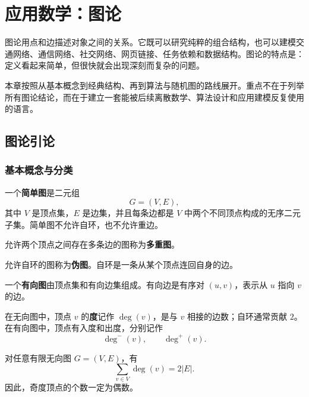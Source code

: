 \chapter{应用数学：图论}

图论用点和边描述对象之间的关系。它既可以研究纯粹的组合结构，也可以建模交通网络、通信网络、社交网络、网页链接、任务依赖和数据结构。图论的特点是：定义看起来简单，但很快就会出现深刻而复杂的问题。

本章按照从基本概念到经典结构、再到算法与随机图的路线展开。重点不在于列举所有图论结论，而在于建立一套能被后续离散数学、算法设计和应用建模反复使用的语言。

\section{图论引论}

\subsection{基本概念与分类}

\begin{definition}[简单图]
一个\textbf{简单图}是二元组
\[
    G=(V,E),
\]
其中 $V$ 是顶点集，$E$ 是边集，并且每条边都是 $V$ 中两个不同顶点构成的无序二元子集。简单图不允许自环，也不允许重边。
\end{definition}

\begin{definition}[多重图]
允许两个顶点之间存在多条边的图称为\textbf{多重图}。
\end{definition}

\begin{definition}[伪图]
允许自环的图称为\textbf{伪图}。自环是一条从某个顶点连回自身的边。
\end{definition}

\begin{definition}[有向图]
一个\textbf{有向图}由顶点集和有向边集组成。有向边是有序对 $(u,v)$，表示从 $u$ 指向 $v$ 的边。
\end{definition}

\begin{definition}[度]
在无向图中，顶点 $v$ 的\textbf{度}记作 $\deg(v)$，是与 $v$ 相接的边数；自环通常贡献 $2$。在有向图中，顶点有入度和出度，分别记作
\[
    \deg^-(v),\qquad \deg^+(v).
\]
\end{definition}

\begin{theorem}[握手引理]
对任意有限无向图 $G=(V,E)$，有
\[
    \sum_{v\in V}\deg(v)=2|E|.
\]
因此，奇度顶点的个数一定为偶数。
\end{theorem}

